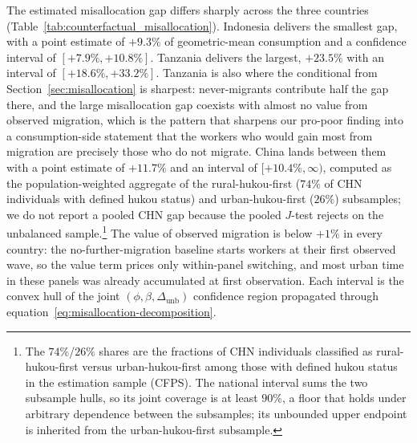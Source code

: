 \documentclass[12pt]{article}
\begin{document}
The estimated misallocation gap differs sharply across the three countries (Table~\ref{tab:counterfactual_misallocation}).
Indonesia delivers the smallest gap, with a point estimate of $+9.3\%$ of geometric-mean consumption and a confidence interval of $[+7.9\%, +10.8\%]$.
Tanzania delivers the largest, $+23.5\%$ with an interval of $[+18.6\%, +33.2\%]$.
Tanzania is also where the conditional from Section~\ref{sec:misallocation} is sharpest: never-migrants contribute half the gap there, and the large misallocation gap coexists with almost no value from observed migration, which is the pattern that sharpens our pro-poor finding into a consumption-side statement that the workers who would gain most from migration are precisely those who do not migrate.
China lands between them with a point estimate of $+11.7\%$ and an interval of $[+10.4\%, \infty)$, computed as the population-weighted aggregate of the rural-hukou-first ($74\%$ of CHN individuals with defined hukou status) and urban-hukou-first ($26\%$) subsamples; we do not report a pooled CHN gap because the pooled $J$-test rejects on the unbalanced sample.\footnote{The $74\%$/$26\%$ shares are the fractions of CHN individuals classified as rural-hukou-first versus urban-hukou-first among those with defined hukou status in the estimation sample (CFPS). The national interval sums the two subsample hulls, so its joint coverage is at least $90\%$, a floor that holds under arbitrary dependence between the subsamples; its unbounded upper endpoint is inherited from the urban-hukou-first subsample.}
The value of observed migration is below $+1\%$ in every country: the no-further-migration baseline starts workers at their first observed wave, so the value term prices only within-panel switching, and most urban time in these panels was already accumulated at first observation.
Each interval is the convex hull of the joint $(\phi, \beta, \Delta_{\text{unb}})$ confidence region propagated through equation~\eqref{eq:misallocation-decomposition}.
\end{document}
